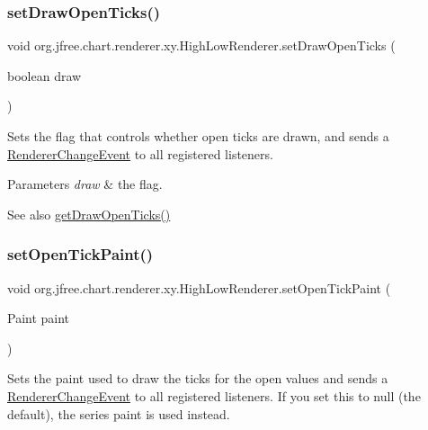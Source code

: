 \subsubsection{\texorpdfstring{set\+Draw\+Open\+Ticks()}{setDrawOpenTicks()}}
{\footnotesize\ttfamily void org.\+jfree.\+chart.\+renderer.\+xy.\+High\+Low\+Renderer.\+set\+Draw\+Open\+Ticks (\begin{DoxyParamCaption}\item[{boolean}]{draw }\end{DoxyParamCaption})}

Sets the flag that controls whether open ticks are drawn, and sends a \mbox{\hyperlink{}{Renderer\+Change\+Event}} to all registered listeners.


\begin{DoxyParams}{Parameters}
{\em draw} & the flag.\\
\hline
\end{DoxyParams}
\begin{DoxySeeAlso}{See also}
\mbox{\hyperlink{classorg_1_1jfree_1_1chart_1_1renderer_1_1xy_1_1_high_low_renderer_af57b0bfb305076aeb2522047392adb44}{get\+Draw\+Open\+Ticks()}} 
\end{DoxySeeAlso}
\mbox{\label{classorg_1_1jfree_1_1chart_1_1renderer_1_1xy_1_1_high_low_renderer_a4655b4b71ecba1e39957fa0a578728c1}} 
\subsubsection{\texorpdfstring{set\+Open\+Tick\+Paint()}{setOpenTickPaint()}}
{\footnotesize\ttfamily void org.\+jfree.\+chart.\+renderer.\+xy.\+High\+Low\+Renderer.\+set\+Open\+Tick\+Paint (\begin{DoxyParamCaption}\item[{Paint}]{paint }\end{DoxyParamCaption})}

Sets the paint used to draw the ticks for the open values and sends a \mbox{\hyperlink{}{Renderer\+Change\+Event}} to all registered listeners. If you set this to {\ttfamily null} (the default), the series paint is used instead.


